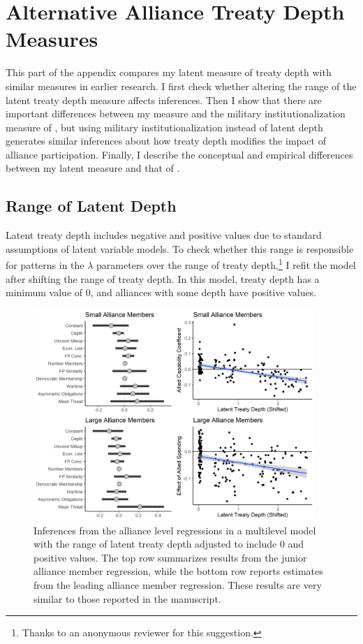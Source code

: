 \documentclass[12pt]{article}
\begin{document}
\section{Alternative Alliance Treaty Depth Measures}

This part of the appendix compares my latent measure of treaty depth with similar measures in earlier research.  
I first check whether altering the range of the latent treaty depth measure affects inferences.  
Then I show that there are important differences between my measure and the military institutionalization measure of \citet{LeedsAnac2005}, but using military institutionalization instead of latent depth generates similar inferences about how treaty depth modifies the impact of alliance participation. 
Finally, I describe the conceptual and empirical differences between my latent measure and that of \citet{BensonClinton2016}.


\subsection{Range of Latent Depth}

Latent treaty depth includes negative and positive values due to standard assumptions of latent variable models. 
To check whether this range is responsible for patterns in the $\lambda$ parameters over the range of treaty depth,\footnote{Thanks to an anonymous reviewer for this suggestion.} I refit the model after shifting the range of treaty depth. 
In this model, treaty depth has a minimum value of 0, and alliances with some depth have positive values. 


\begin{figure}[htbp]
	\centering
		\includegraphics[width=0.95\textwidth]{rsd-plots.png}
	\caption{Inferences from the alliance level regressions in a multilevel model with the range of latent treaty depth adjusted to include 0 and positive values. The top row summarizes results from the junior alliance member regression, while the bottom row reports estimates from the leading alliance member regression. These results are very similar to those reported in the manuscript.}
	\label{fig:rsd-plots}
\end{figure}
\end{document}
